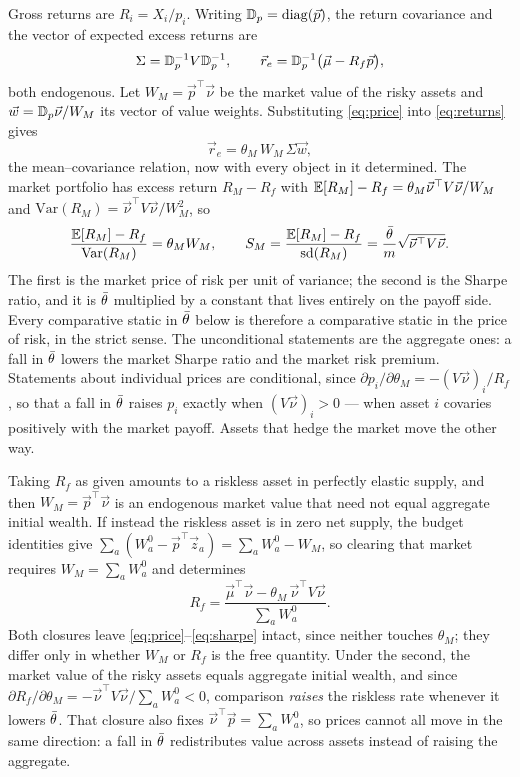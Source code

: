 Gross returns are $R_i=X_i/p_i$. Writing $\mathbb{D}_p=\mathrm{diag}(\vec p)$, the
return covariance and the vector of expected excess returns are
%
\begin{equation}
\Sigma=\mathbb{D}_p^{-1}V\mathbb{D}_p^{-1},
\qquad
\vec r_e=\mathbb{D}_p^{-1}\big(\vec\mu-R_f\vec p\big) ,
\label{eq:returns}
\end{equation}
%
both endogenous. Let $W_M=\vec p^{\top}\vec\nu$ be the market value of the risky
assets and $\vec w=\mathbb{D}_p\vec\nu/W_M$ its vector of value weights. Substituting
\eqref{eq:price} into \eqref{eq:returns} gives
%
\begin{equation}
\vec r_e=\theta_M\,W_M\,\Sigma\vec w ,
\label{eq:clear}
\end{equation}
%
the mean--covariance relation, now with every object in it determined. The
market portfolio has excess return $R_M-R_f$ with
$\mathbb{E}[R_M]-R_f=\theta_M\vec\nu^{\top}V\vec\nu/W_M$ and
$\mathrm{Var}(R_M)=\vec\nu^{\top}V\vec\nu/W_M^{2}$, so
%
\begin{equation}
\frac{\mathbb{E}[R_M]-R_f}{\mathrm{Var}(R_M)}=\theta_MW_M ,
\qquad
S_M=\frac{\mathbb{E}[R_M]-R_f}{\mathrm{sd}(R_M)}
=\frac{\bar\theta}{m}\sqrt{\vec\nu^{\top}V\vec\nu} .
\label{eq:sharpe}
\end{equation}
%
The first is the market price of risk per unit of variance; the second is the
Sharpe ratio, and it is $\bar\theta$ multiplied by a constant that lives entirely on
the payoff side. Every comparative static in $\bar\theta$ below is therefore a
comparative static in the price of risk, in the strict sense. The
unconditional statements are the aggregate ones: a fall in $\bar\theta$ lowers the
market Sharpe ratio and the market risk premium. Statements about individual
prices are conditional, since
$\partial p_i/\partial\theta_M=-(V\vec\nu)_i/R_f$, so that a fall in $\bar\theta$
raises $p_i$ exactly when $(V\vec\nu)_i>0$ --- when asset $i$ covaries
positively with the market payoff. Assets that hedge the market move the other
way.

\begin{remark}
\label{rem:rf}
Taking $R_f$ as given amounts to a riskless asset in perfectly elastic supply,
and then $W_M=\vec p^{\top}\vec\nu$ is an endogenous market value that need not
equal aggregate initial wealth. If instead the riskless asset is in zero net
supply, the budget identities give $\sum_a(W_a^0-\vec p^{\top}\vec z_a)
=\sum_aW_a^0-W_M$, so clearing that market requires
$W_M=\sum_aW_a^0$ and determines
%
\begin{equation*}
R_f=\frac{\vec\mu^{\top}\vec\nu-\theta_M\,\vec\nu^{\top}V\vec\nu}
{\sum_aW_a^0} .
\end{equation*}
%
Both closures leave \eqref{eq:price}--\eqref{eq:sharpe} intact, since neither
touches $\theta_M$; they differ only in whether $W_M$ or $R_f$ is the free
quantity. Under the second, the market value of the risky assets equals
aggregate initial wealth, and since
$\partial R_f/\partial\theta_M=-\vec\nu^{\top}V\vec\nu/\sum_aW_a^0<0$,
comparison \emph{raises} the riskless rate whenever it lowers $\bar\theta$. That
closure also fixes $\vec\nu^{\top}\vec p=\sum_aW_a^0$, so prices cannot all move
in the same direction: a fall in $\bar\theta$ redistributes value across assets
instead of raising the aggregate.
\end{remark}

